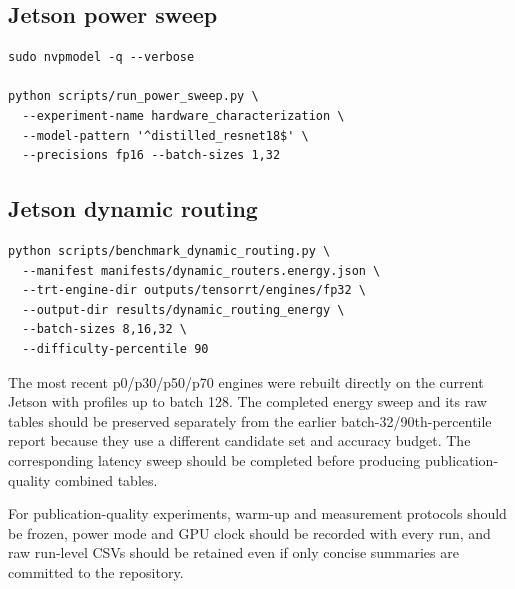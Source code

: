 \documentclass[11pt,a4paper]{article}
\begin{document}
\subsection{Jetson power sweep}
\begin{lstlisting}
sudo nvpmodel -q --verbose

python scripts/run_power_sweep.py \
  --experiment-name hardware_characterization \
  --model-pattern '^distilled_resnet18$' \
  --precisions fp16 --batch-sizes 1,32
\end{lstlisting}

\subsection{Jetson dynamic routing}
\begin{lstlisting}
python scripts/benchmark_dynamic_routing.py \
  --manifest manifests/dynamic_routers.energy.json \
  --trt-engine-dir outputs/tensorrt/engines/fp32 \
  --output-dir results/dynamic_routing_energy \
  --batch-sizes 8,16,32 \
  --difficulty-percentile 90
\end{lstlisting}

The most recent p0/p30/p50/p70 engines were rebuilt directly on the current Jetson with profiles up to batch 128. The completed energy sweep and its raw tables should be preserved separately from the earlier batch-32/90th-percentile report because they use a different candidate set and accuracy budget. The corresponding latency sweep should be completed before producing publication-quality combined tables.

For publication-quality experiments, warm-up and measurement protocols should be frozen, power mode and GPU clock should be recorded with every run, and raw run-level CSVs should be retained even if only concise summaries are committed to the repository.
\end{document}
